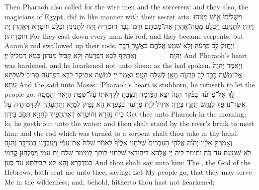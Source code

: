 {Then Pharaoh also called for the wise men and the sorcerers; and they also, the magicians of Egypt, did in like manner with their secret arts.}{}
{וַיַּשְׁלִ֙יכוּ֙ אִ֣ישׁ מַטֵּ֔הוּ וַיִּהְי֖וּ לְתַנִּינִ֑ם וַיִּבְלַ֥ע מַטֵּֽה־אַהֲרֹ֖ן אֶת־מַטֹּתָֽם׃
}
{וּרְמוֹ גְּבַר חוּטְרֵיהּ וַהֲווֹ לְתַנִּינִין וּבְלַע חוּטְרָא דְּאַהֲרֹן יָת חוּטְרֵיהוֹן׃}
{For they cast down every man his rod, and they became serpents; but Aaron’s rod swallowed up their rods.}{}
{וַיֶּחֱזַק֙ לֵ֣ב פַּרְעֹ֔ה וְלֹ֥א שָׁמַ֖ע אֲלֵהֶ֑ם כַּאֲשֶׁ֖ר דִּבֶּ֥ר יְהֹוָֽה׃ \setuma         }
{וְאִתַּקַּף לִבָּא דְּפַרְעֹה וְלָא קַבֵּיל מִנְּהוֹן כְּמָא דְּמַלֵּיל יְיָ׃}
{And Pharaoh’s heart was hardened, and he hearkened not unto them; as the \lord\space had spoken.}{}
{וַיֹּ֤אמֶר יְהֹוָה֙ אֶל־מֹשֶׁ֔ה כָּבֵ֖ד לֵ֣ב פַּרְעֹ֑ה מֵאֵ֖ן לְשַׁלַּ֥ח הָעָֽם׃
}
{וַאֲמַר יְיָ לְמֹשֶׁה אִתְיַקַּר לִבָּא דְּפַרְעֹה סָרֵיב לְשַׁלָּחָא עַמָּא׃}
{And the \lord\space said unto Moses: ‘Pharaoh’s heart is stubborn, he refuseth to let the people go.}{}
{לֵ֣ךְ אֶל־פַּרְעֹ֞ה בַּבֹּ֗קֶר הִנֵּה֙ יֹצֵ֣א הַמַּ֔יְמָה וְנִצַּבְתָּ֥ לִקְרָאת֖וֹ עַל־שְׂפַ֣ת הַיְאֹ֑ר וְהַמַּטֶּ֛ה אֲשֶׁר־נֶהְפַּ֥ךְ לְנָחָ֖שׁ תִּקַּ֥ח בְּיָדֶֽךָ׃
}
{אִיזֵיל לְוָת פַּרְעֹה בְּצַפְרָא הָא נָפֵיק לְמַיָּא וְתִתְעַתַּד לְקַדָּמוּתֵיהּ עַל כֵּיף נַהְרָא וְחוּטְרָא דְּאִתְהֲפֵיךְ לְחִוְיָא תִּסַּב בִּידָךְ׃}
{Get thee unto Pharaoh in the morning; lo, he goeth out unto the water; and thou shalt stand by the river’s brink to meet him; and the rod which was turned to a serpent shalt thou take in thy hand.}{}
{וְאָמַרְתָּ֣ אֵלָ֗יו יְהֹוָ֞ה אֱלֹהֵ֤י הָעִבְרִים֙ שְׁלָחַ֤נִי אֵלֶ֙יךָ֙ לֵאמֹ֔ר שַׁלַּח֙ אֶת־עַמִּ֔י וְיַֽעַבְדֻ֖נִי בַּמִּדְבָּ֑ר וְהִנֵּ֥ה לֹא־שָׁמַ֖עְתָּ עַד־כֹּֽה׃
}
{וְתֵימַר לֵיהּ יְיָ אֱלָהָא דִּיהוּדָאֵי שַׁלְחַנִי לְוָתָךְ לְמֵימַר שַׁלַּח יָת עַמִּי וְיִפְלְחוּן קֳדָמַי בְּמַדְבְּרָא וְהָא לָא קַבֵּילְתָּא עַד כְּעַן׃}
{And thou shalt say unto him: The \lord, the God of the Hebrews, hath sent me unto thee, saying: Let My people go, that they may serve Me in the wilderness; and, behold, hitherto thou hast not hearkened;}{}

